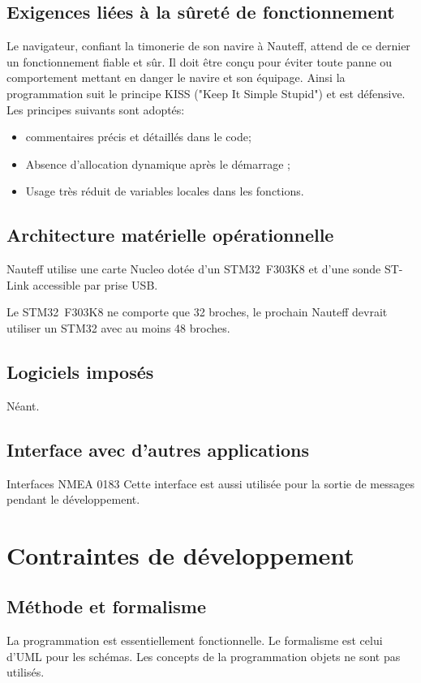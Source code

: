 \documentclass[a4paper,11pt]{report}
\begin{document}
\subsection{Exigences liées à la sûreté de fonctionnement}
Le navigateur, confiant la timonerie de son navire à Nauteff,
attend de ce dernier un fonctionnement fiable et sûr.
Il doit être conçu pour éviter toute panne ou
comportement mettant en danger le navire et son équipage.
Ainsi la programmation suit le principe KISS ("Keep It Simple Stupid")
et est défensive.
Les principes suivants sont adoptés:
\begin{itemize}
    \item commentaires précis et détaillés dans le code;
	\item Absence d'allocation dynamique après le démarrage ;
	\item Usage très réduit de variables locales dans les fonctions.
\end{itemize}

\subsection{Architecture matérielle opérationnelle}
Nauteff utilise une carte Nucleo dotée d'un STM32~F303K8
et d'une sonde ST-Link accessible par prise USB.

Le STM32~F303K8 ne comporte que 32 broches, le prochain Nauteff
devrait utiliser un STM32 avec au moins 48 broches.
\subsection{Logiciels imposés}
Néant.
\subsection{Interface avec d'autres applications}
Interfaces NMEA 0183
Cette interface est aussi utilisée pour la sortie de messages
pendant le développement.
\section{Contraintes de développement}
\subsection{Méthode et formalisme}
La programmation est essentiellement fonctionnelle.
Le formalisme est celui d'UML pour les schémas.
Les concepts de la programmation objets ne sont pas utilisés.
\end{document}
